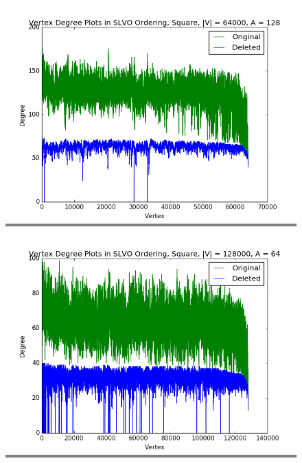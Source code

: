 \documentclass{article}
\begin{document}
\begin{figure}
\begin{minipage}{0.3\textwidth}
    \colorbox{gray}{\includegraphics[width=\linewidth]{./graphs/hist_deg_del_square_4.png}}
    \end{minipage}
    \hspace{\fill}
    \begin{minipage}{0.3\textwidth}
    \colorbox{gray}{\includegraphics[width=\linewidth]{./graphs/hist_deg_del_square_5.png}}
    \end{minipage}
    \vskip 0.1in
    \begin{minipage}{0.3\textwidth}

\end{minipage}
\end{figure}
\end{document}
